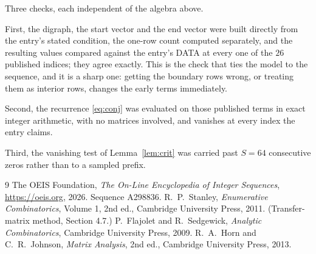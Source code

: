 \documentclass[11pt,a4paper]{article}
\theoremstyle{plain}
\theoremstyle{definition}
\begin{document}
Three checks, each independent of the algebra above.

First, the digraph, the start vector and the end vector were built directly from the
entry's stated condition, the one-row count computed separately, and the resulting values
compared against the entry's DATA at every one of the $26$ published indices; they
agree exactly. This is the check that ties the model to the sequence, and it is a sharp one:
getting the boundary rows wrong, or treating them as interior rows, changes the early terms
immediately.

Second, the recurrence \eqref{eq:conj} was evaluated on those published terms in exact
integer arithmetic, with no matrices involved, and vanishes at every index the entry claims.

Third, the vanishing test of Lemma~\ref{lem:crit} was carried past $S=64$ consecutive
zeros rather than to a sampled prefix.

\begin{thebibliography}{9}
 The OEIS Foundation, \emph{The On-Line Encyclopedia of Integer
Sequences}, \url{https://oeis.org}, 2026. Sequence A298836.
 R.~P.~Stanley, \emph{Enumerative Combinatorics}, Volume 1, 2nd ed.,
Cambridge University Press, 2011. (Transfer-matrix method, Section 4.7.)
 P.~Flajolet and R.~Sedgewick, \emph{Analytic Combinatorics}, Cambridge
University Press, 2009.
 R.~A.~Horn and C.~R.~Johnson, \emph{Matrix Analysis}, 2nd ed., Cambridge
University Press, 2013.
\end{thebibliography}
\end{document}
